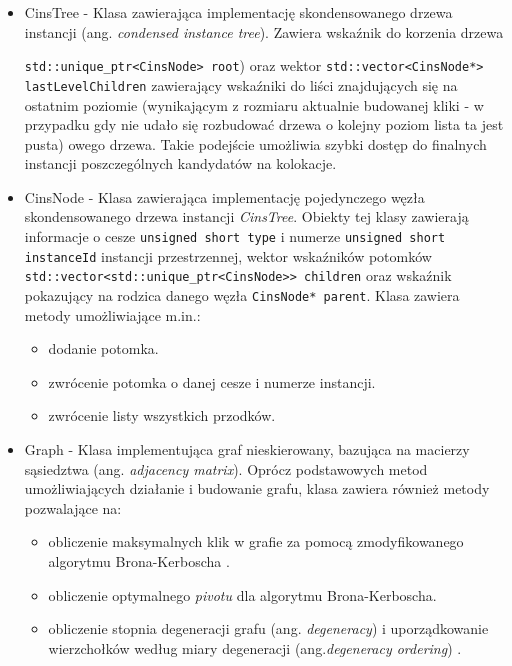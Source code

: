 \documentclass[12pt]{article}
\begin{document}
\begin{itemize}
\item CinsTree - Klasa zawierająca implementację skondensowanego drzewa instancji (ang. \textit{condensed instance tree}). Zawiera wskaźnik do korzenia drzewa \raggedright \lstinline{std::unique_ptr<CinsNode> root}) oraz wektor \lstinline{std::vector<CinsNode*> lastLevelChildren} zawierający wskaźniki do liści znajdujących się na ostatnim poziomie (wynikającym z rozmiaru aktualnie budowanej kliki - w przypadku gdy nie udało się rozbudować drzewa o kolejny poziom lista ta jest pusta) owego drzewa. Takie podejście umożliwia szybki dostęp do finalnych instancji poszczególnych kandydatów na kolokacje.

\item CinsNode - Klasa zawierająca implementację pojedynczego węzła skondensowanego drzewa instancji \textit{CinsTree}. Obiekty tej klasy zawierają informacje o cesze \lstinline{unsigned short type} i numerze \lstinline{unsigned short instanceId} instancji przestrzennej, wektor wskaźników potomków \lstinline{std::vector<std::unique_ptr<CinsNode>> children} oraz wskaźnik pokazujący na rodzica danego węzła \lstinline{CinsNode* parent}. Klasa zawiera metody umożliwiające m.in.:

\begin{itemize}
\item dodanie potomka.
\item zwrócenie potomka o danej cesze i numerze instancji.
\item zwrócenie listy wszystkich przodków.
\end{itemize}

\item Graph - Klasa implementująca graf nieskierowany, bazująca na macierzy sąsiedztwa (ang. \textit{adjacency matrix}). Oprócz podstawowych metod umożliwiających działanie i budowanie grafu, klasa zawiera również metody pozwalające na:

\begin{itemize}
\item obliczenie maksymalnych klik w grafie za pomocą zmodyfikowanego algorytmu Brona-Kerboscha \cite{chinczyki}.
\item obliczenie optymalnego \textit{pivotu} \cite{pivot} dla algorytmu Brona-Kerboscha.
\item obliczenie stopnia degeneracji grafu (ang. \textit{degeneracy}) i uporządkowanie wierzchołków według miary degeneracji (ang.\textit{degeneracy ordering}) \cite{degenerat}.
\end{itemize}


\end{itemize}
\end{document}
